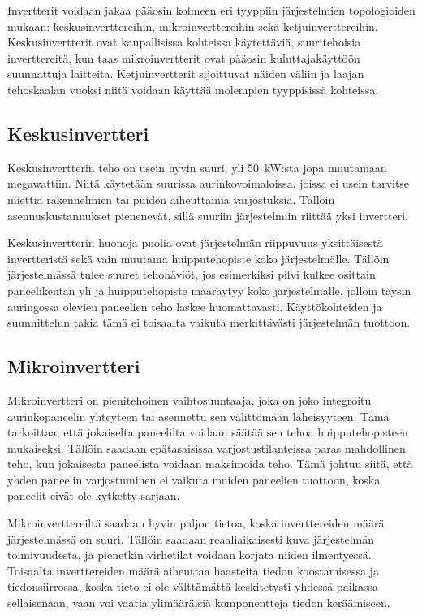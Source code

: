   Invertterit voidaan jakaa pääosin kolmeen eri tyyppiin järjestelmien topologioiden mukaan: keskusinverttereihin, mikroinverttereihin sekä ketjuinverttereihin. Keskusinvertterit ovat kaupallisissa kohteissa käytettäviä, suuritehoisia inverttereitä, kun taas mikroinvertterit ovat pääosin kuluttajakäyttöön suunnattuja laitteita. Ketjuinvertterit sijoittuvat näiden väliin ja laajan tehoskaalan vuoksi niitä voidaan käyttää molempien tyyppisissä kohteissa.

\subsection{Keskusinvertteri}
  Keskusinvertterin teho on usein hyvin suuri, yli \SI{50}{\kilo\watt}:sta jopa muutamaan megawattiin. Niitä käytetään suurissa aurinkovoimaloissa, joissa ei usein tarvitse miettiä rakennelmien tai puiden aiheuttamia varjostuksia. Tällöin asennuskustannukset pienenevät, sillä suuriin järjestelmiin riittää yksi invertteri.

  Keskusinvertterin huonoja puolia ovat järjestelmän riippuvuus yksittäisestä invertteristä sekä vain muutama huipputehopiste koko järjestelmälle. Tällöin järjestelmässä tulee suuret tehohäviöt, jos esimerkiksi pilvi kulkee osittain paneelikentän yli ja huipputehopiste määräytyy koko järjestelmälle, jolloin täysin auringossa olevien paneelien teho laskee huomattavasti. Käyttökohteiden ja suunnittelun takia tämä ei toisaalta vaikuta merkittävästi järjestelmän tuottoon.

\subsection{Mikroinvertteri}
  Mikroinvertteri on pienitehoinen vaihtosuuntaaja, joka on joko integroitu aurinkopaneelin yhteyteen tai asennettu sen välittömään läheisyyteen. Tämä tarkoittaa, että jokaiselta paneelilta voidaan säätää sen tehoa huipputehopisteen mukaiseksi. Tällöin saadaan epätasaisissa varjostustilanteissa paras mahdollinen teho, kun jokaisesta paneelista voidaan maksimoida teho. Tämä johtuu siitä, että yhden paneelin varjostuminen ei vaikuta muiden paneelien tuottoon, koska paneelit eivät ole kytketty sarjaan.

  Mikroinverttereiltä saadaan hyvin paljon tietoa, koska inverttereiden määrä järjestelmässä on suuri. Tällöin saadaan reaaliaikaisesti kuva järjestelmän toimivuudesta, ja pienetkin virhetilat voidaan korjata niiden ilmentyessä. Toisaalta inverttereiden määrä aiheuttaa haasteita tiedon koostamisessa ja tiedonsiirrossa, koska tieto ei ole välttämättä keskitetysti yhdessä paikassa sellaisenaan, vaan voi vaatia ylimääräisiä komponentteja tiedon keräämiseen.

